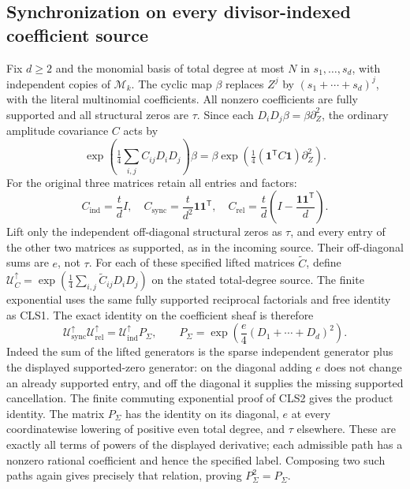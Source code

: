 \subsection{Synchronization on every divisor-indexed coefficient source}
Fix $d\ge2$ and the monomial basis of total degree at most $N$
in $s_1,\ldots,s_d$, with independent copies of $\mathcal M_k$.
The cyclic map $\beta$ replaces $Z^j$ by
$(s_1+\cdots+s_d)^j$, with the literal multinomial coefficients.
All nonzero coefficients are fully supported and all structural
zeros are $\tau$. Since each $D_iD_j\beta=\beta\partial_Z^2$,
the ordinary amplitude covariance $C$ acts by
\begin{equation}\tag{CLS9}
 \exp\left(\tfrac14\sum_{i,j}C_{ij}D_iD_j\right)\beta
 =\beta\exp\left(\tfrac14(\mathbf1^{\mathsf T}C\mathbf1)
                                           \partial_Z^2\right).
\end{equation}
For the original three matrices retain all entries and factors:
\begin{equation}\tag{CLS10}
 C_{\mathrm{ind}}=\frac td I,
 \quad C_{\mathrm{sync}}=\frac t{d^2}\mathbf1\mathbf1^{\mathsf T},
 \quad C_{\mathrm{rel}}=\frac td
       \left(I-\frac{\mathbf1\mathbf1^{\mathsf T}}d\right).
\end{equation}
Lift only the independent off-diagonal structural zeros as $\tau$,
and every entry of the other two matrices as supported, as in the
incoming source. Their off-diagonal sums are $e$, not $\tau$.
For each of these specified lifted matrices $\widetilde C$, define
$\mathcal U_C^\uparrow=
\exp(\tfrac14\sum_{i,j}\widetilde C_{ij}D_iD_j)$ on the stated
total-degree source. The finite exponential uses the same fully
supported reciprocal factorials and free identity as CLS1.
The exact identity on the coefficient sheaf is therefore
\begin{equation}\tag{CLS11}
 \mathcal U_{\mathrm{sync}}^\uparrow
 \mathcal U_{\mathrm{rel}}^\uparrow
 =\mathcal U_{\mathrm{ind}}^\uparrow P_\Sigma,
 \qquad
 P_\Sigma=\exp\left(\frac e4
                         (D_1+\cdots+D_d)^2\right).
\end{equation}
Indeed the sum of the lifted generators is the sparse independent
generator plus the displayed supported-zero generator: on the diagonal
adding $e$ does not change an already supported entry, and off the
diagonal it supplies the missing supported cancellation. The finite
commuting exponential proof of CLS2 gives the product identity.
The matrix $P_\Sigma$ has the identity on its diagonal, $e$ at
every coordinatewise lowering of positive even total degree, and
$\tau$ elsewhere. These are exactly all terms of powers of the
displayed derivative; each admissible path has a nonzero rational
coefficient and hence the specified label. Composing two such paths
again gives precisely that relation, proving $P_\Sigma^2=P_\Sigma$.


